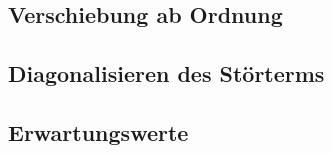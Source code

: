 \subsection{Verschiebung ab Ordnung}

\subsection{Diagonalisieren des Störterms}

\subsection{Erwartungswerte}




\IfFileExists{\bibliographyfile}{
}{}



